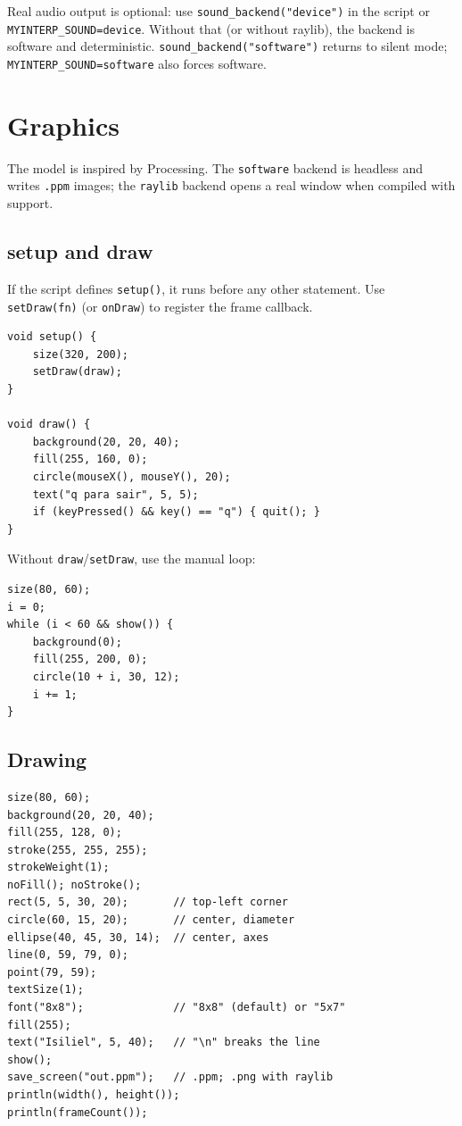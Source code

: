 \documentclass[11pt,a4paper,oneside]{report}
\newcommand{\code}[1]{\texttt{#1}}
\begin{document}
Real audio output is optional: use \code{sound\_backend("device")} in the
script or \code{MYINTERP\_SOUND=device}. Without that (or without raylib),
the backend is software and deterministic. \code{sound\_backend("software")}
returns to silent mode; \code{MYINTERP\_SOUND=software} also forces
software.

\chapter{Graphics}
\label{cap:graficos}

The model is inspired by Processing. The \code{software} backend is
headless and writes \code{.ppm} images; the \code{raylib} backend opens a
real window when compiled with support.

\section{setup and draw}
If the script defines \code{setup()}, it runs before any other statement.
Use \code{setDraw(fn)} (or \code{onDraw}) to register the frame
callback.

\begin{lstlisting}
void setup() {
    size(320, 200);
    setDraw(draw);
}

void draw() {
    background(20, 20, 40);
    fill(255, 160, 0);
    circle(mouseX(), mouseY(), 20);
    text("q para sair", 5, 5);
    if (keyPressed() && key() == "q") { quit(); }
}
\end{lstlisting}

Without \code{draw}/\code{setDraw}, use the manual loop:
\begin{lstlisting}
size(80, 60);
i = 0;
while (i < 60 && show()) {
    background(0);
    fill(255, 200, 0);
    circle(10 + i, 30, 12);
    i += 1;
}
\end{lstlisting}

\section{Drawing}
\begin{lstlisting}
size(80, 60);
background(20, 20, 40);
fill(255, 128, 0);
stroke(255, 255, 255);
strokeWeight(1);
noFill(); noStroke();
rect(5, 5, 30, 20);       // top-left corner
circle(60, 15, 20);       // center, diameter
ellipse(40, 45, 30, 14);  // center, axes
line(0, 59, 79, 0);
point(79, 59);
textSize(1);
font("8x8");              // "8x8" (default) or "5x7"
fill(255);
text("Isiliel", 5, 40);   // "\n" breaks the line
show();
save_screen("out.ppm");   // .ppm; .png with raylib
println(width(), height());
println(frameCount());
\end{lstlisting}
\end{document}
